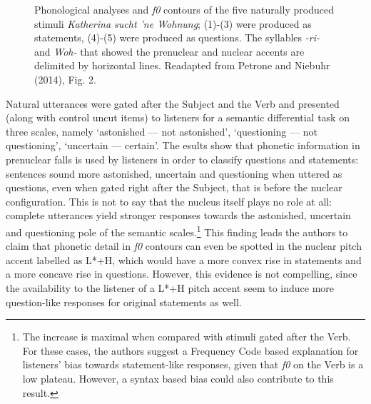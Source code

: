 \begin{figure}
\centering
{}
\caption{Phonological analyses and \textit{f0} contours of the five naturally produced stimuli \textit{Katherina sucht 'ne Wohnung}; (1)-(3) were produced as statements, (4)-(5) were produced as questions. The syllables \textit{-ri-} and \textit{Woh-} that showed the prenuclear and nuclear accents are delimited by horizontal lines. Readapted from Petrone and Niebuhr (2014), Fig. 2.}
\label{fig302}\end{figure}

Natural utterances were gated after the Subject and the Verb and presented (along with control uncut items) to listeners for a semantic differential task on three scales, namely ‘astonished --- not astonished', ‘questioning --- not questioning', ‘uncertain --- certain'. The esults show that phonetic information in prenuclear falls is used by listeners in order to classify questions and statements: sentences sound more astonished, uncertain and questioning when uttered as questions, even when gated right after the Subject, that is before the nuclear configuration. This is not to say that the nucleus itself plays no role at all: complete utterances yield stronger responses towards the astonished, uncertain and questioning pole of the semantic scales.\footnote{The increase is maximal when compared with stimuli gated after the Verb. For these cases, the authors suggest a Frequency Code based explanation for listeners' bias towards statement-like responses, given that \textit{f0} on the Verb is a low plateau. However, a syntax based bias could also contribute to this result.} This finding leads the authors to claim that phonetic detail in \textit{f0} contours can even be spotted in the nuclear pitch accent labelled as L*+H, which would have a more convex rise in statements and a more concave rise in questions. However, this evidence is not compelling, since the availability to the listener of a L*+H pitch accent seem to induce more question-like responses for original statements as well.

